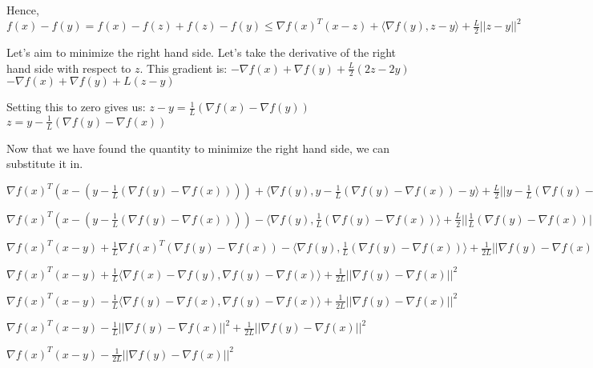 Hence, $f(x) - f(y) = f(x) - f(z) + f(z) - f(y) \leq \nabla f(x)^T(x - z) + \langle \nabla f(y), z - y \rangle + \frac{L}{2} ||z - y||^2$

\noindent Let's aim to minimize the right hand side. \newline 
Let's take the derivative of the right hand side with respect to $z$. This gradient is: \newline 
$-\nabla f(x) + \nabla f(y) + \frac{L}{2} (2z -2y)$ \newline 
$-\nabla f(x) + \nabla f(y) + L (z - y)$

Setting this to zero gives us: $z - y = \frac{1}{L}(\nabla f(x) - \nabla f(y))$ \newline 
$z = y - \frac{1}{L}(\nabla f(y) - \nabla f(x))$

Now that we have found the quantity to minimize the right hand side, we can substitute it in.

$\nabla f(x)^T(x - (y - \frac{1}{L}(\nabla f(y) - \nabla f(x)))) + \langle \nabla f(y), y - \frac{1}{L}(\nabla f(y) - \nabla f(x)) - y \rangle + \frac{L}{2} ||y - \frac{1}{L}(\nabla f(y) - \nabla f(x)) - y||^2$ \newline 

$\nabla f(x)^T(x - (y - \frac{1}{L}(\nabla f(y) - \nabla f(x)))) - \langle \nabla f(y),  \frac{1}{L}(\nabla f(y) - \nabla f(x))\rangle + \frac{L}{2} ||\frac{1}{L}(\nabla f(y) - \nabla f(x))||^2$ \newline 

$\nabla f(x)^T (x - y) + \frac{1}{L} \nabla f(x)^T (\nabla f(y) - \nabla f(x)) - \langle \nabla f(y),  \frac{1}{L}(\nabla f(y) - \nabla f(x))\rangle + \frac{1}{2L} ||\nabla f(y) - \nabla f(x)||^2$ \newline 

$\nabla f(x)^T (x - y) + \frac{1}{L} \langle \nabla f(x) - \nabla f(y), \nabla f(y) - \nabla f(x) \rangle + \frac{1}{2L} ||\nabla f(y) - \nabla f(x)||^2$ \newline 

$\nabla f(x)^T (x - y) - \frac{1}{L} \langle \nabla f(y) - \nabla f(x), \nabla f(y) - \nabla f(x) \rangle + \frac{1}{2L} ||\nabla f(y) - \nabla f(x)||^2$ \newline 

$\nabla f(x)^T (x - y) - \frac{1}{L} ||\nabla f(y) - \nabla f(x)||^2 + \frac{1}{2L} ||\nabla f(y) - \nabla f(x)||^2$ \newline 

$\nabla f(x)^T (x - y) - \frac{1}{2L} ||\nabla f(y) - \nabla f(x)||^2$ \newline 


